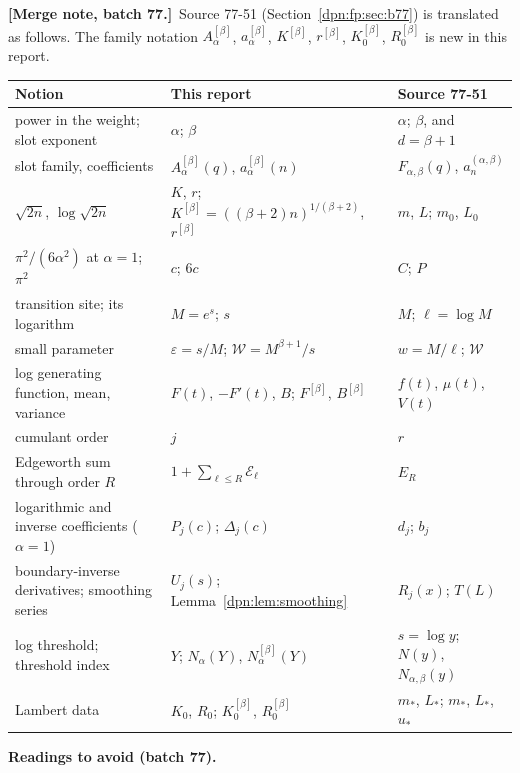 \documentclass[11pt]{article}
\numberwithin{equation}{section}
\theoremstyle{definition}\newtheorem{definition}[theorem]{Definition}
\theoremstyle{remark}\newtheorem{remark}[theorem]{Remark}
\newcommand{\eps}{\varepsilon}
\newcommand{\mergenotec}[1]{\par\smallskip\noindent\textbf{[Merge note, batch 77.]}\ #1\par\smallskip}
\begin{document}
\mergenotec{Source 77-51 (Section~\ref{dpn:fp:sec:b77}) is translated as
follows.  The family notation $A^{[\beta]}_\alpha$, $a^{[\beta]}_\alpha$,
$K^{[\beta]}$, $r^{[\beta]}$, $K^{[\beta]}_0$, $R^{[\beta]}_0$ is new in this report.}
\begin{center}
\small
\begin{tabular}{>{\raggedright\arraybackslash}p{4.6cm}>{\raggedright\arraybackslash}p{4.6cm}>{\raggedright\arraybackslash}p{4.6cm}}
\toprule
Notion & This report & Source 77-51\\
\midrule
power in the weight; slot exponent & $\alpha$; $\beta$ & $\alpha$; $\beta$, and $d=\beta+1$\\
slot family, coefficients & $A^{[\beta]}_\alpha(q)$, $a^{[\beta]}_\alpha(n)$ & $F_{\alpha,\beta}(q)$, $a^{(\alpha,\beta)}_n$\\
$\sqrt{2n}$, $\log\sqrt{2n}$ & $K$, $r$; $K^{[\beta]}=((\beta+2)n)^{1/(\beta+2)}$, $r^{[\beta]}$ & $m$, $L$; $m_0$, $L_0$\\
$\pi^2/(6\alpha^2)$ at $\alpha=1$; $\pi^2$ & $c$; $6c$ & $C$; $P$\\
transition site; its logarithm & $M=e^s$; $s$ & $M$; $\ell=\log M$\\
small parameter & $\eps=s/M$; $\mathcal W=M^{\beta+1}/s$ & $w=M/\ell$; $\mathcal W$\\
log generating function, mean, variance & $F(t)$, $-F'(t)$, $B$; $F^{[\beta]}$, $B^{[\beta]}$ & $f(t)$, $\mu(t)$, $V(t)$\\
cumulant order & $j$ & $r$\\
Edgeworth sum through order $R$ & $1+\sum_{\ell\le R}\mathcal E_\ell$ & $E_R$\\
logarithmic and inverse coefficients ($\alpha=1$) & $P_j(c)$; $\Delta_j(c)$ & $d_j$; $b_j$\\
boundary-inverse derivatives; smoothing series & $U_j(s)$; Lemma~\ref{dpn:lem:smoothing} & $R_j(x)$; $T(L)$\\
log threshold; threshold index & $Y$; $N_\alpha(Y)$, $N^{[\beta]}_\alpha(Y)$ & $s=\log y$; $N(y)$, $N_{\alpha,\beta}(y)$\\
Lambert data & $K_0$, $R_0$; $K^{[\beta]}_0$, $R^{[\beta]}_0$ & $m_*$, $L_*$; $m_*$, $L_*$, $u_*$\\
\bottomrule
\end{tabular}
\end{center}
\noindent\textbf{Readings to avoid (batch 77).}
\end{document}
